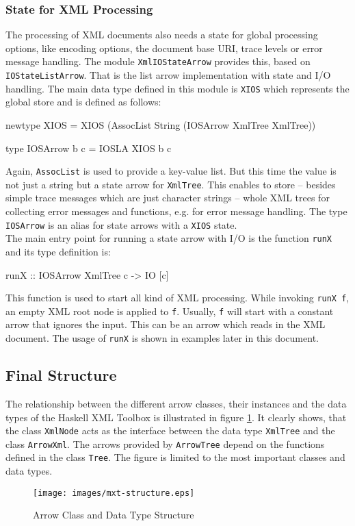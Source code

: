 \documentclass[11pt,a4paper,headsepline, bibtotoc]{scrreprt}
\begin{document}
\subsubsection{State for XML Processing}\label{xmlstate}
The processing of XML documents also needs a state for global processing options, like encoding options, the document base URI, trace levels or error message handling. The module \texttt{XmlIO\-StateArrow} provides this, based on \texttt{IOStateListArrow}. That is the list arrow implementation with state and I/O handling. The main data type defined in this module is \texttt{XIOS} which represents the global store and is defined as follows:
\begin{code}
newtype XIOS 
    = XIOS (AssocList String (IOSArrow XmlTree XmlTree))

type IOSArrow b c = IOSLA XIOS b c
\end{code}
Again, \texttt{AssocList} is used to provide a key-value list. But this time the value is not just a string but a state arrow for \texttt{XmlTree}. This enables to store -- besides simple trace messages which are just character strings -- whole XML trees for collecting error messages and functions, e.g. for error message handling. The type \texttt{IOSArrow} is an alias for state arrows with a \texttt{XIOS} state.\\
The main entry point for running a state arrow with I/O is the function \texttt{runX} and its type definition is:
\begin{code}
runX :: IOSArrow XmlTree c -> IO [c]
\end{code}
This function is used to start all kind of XML processing. While invoking \texttt{runX f}, an empty XML root node is applied to \texttt{f}. Usually, \texttt{f} will start with a constant arrow that ignores the input. This can be an arrow which reads in the XML document. The usage of \texttt{runX} is shown in examples later in this document.

\subsection{Final Structure}
The relationship between the different arrow classes, their instances and the data types of the Haskell XML Toolbox is illustrated in figure \ref{mxt_structure}. It clearly shows, that the class \texttt{XmlNode} acts as the interface between the data type \texttt{XmlTree} and the class \texttt{ArrowXml}. The arrows provided by \texttt{ArrowTree} depend on the functions defined in the class \texttt{Tree}. The figure is limited to the most important classes and data types. 
\begin{figure}[H]
        \caption{Arrow Class and Data Type Structure}
        \label{mxt_structure}
        \texttt{[image: images/mxt-structure.eps]}
\end{figure}
\end{document}
